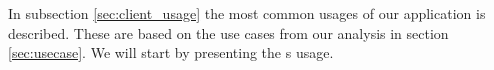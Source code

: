In subsection \ref{sec:client_usage} the most common usages of our application is described.
These are based on the use cases from our analysis in section \ref{sec:usecase}.
We will start by presenting the \aclient[]s usage.







